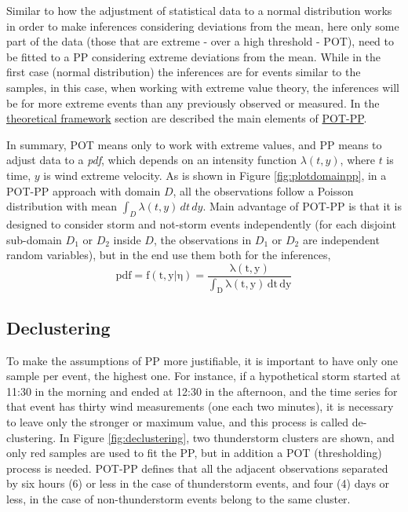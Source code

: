 \documentclass[12pt,oneside]{reedthesis}
\begin{document}
Similar to how the adjustment of statistical data to a normal distribution works in order to make inferences considering deviations from the mean, here only some part of the data (those that are extreme - over a high threshold - POT), need to be fitted to a PP considering extreme deviations from the mean. While in the first case (normal distribution) the inferences are for events similar to the samples, in this case, when working with extreme value theory, the inferences will be for more extreme events than any previously observed or measured. In the \protect\hyperlink{rmd-thefra}{theoretical framework} section are described the main elements of \protect\hyperlink{pot-pp}{POT-PP}.

In summary, POT means only to work with extreme values, and PP means to adjust data to a \emph{pdf}, which depends on an intensity function \(\lambda(t,y)\), where \(t\) is time, \(y\) is wind extreme velocity. As is shown in Figure \ref{fig:plotdomainpp}, in a POT-PP approach with domain \(D\), all the observations follow a Poisson distribution with mean \(\int_D\lambda(t,y)\,dt\,dy\). Main advantage of POT-PP is that it is designed to consider storm and not-storm events independently (for each disjoint sub-domain \(D_1\) or \(D_2\) inside \(D\), the observations in \(D_1\) or \(D_2\) are independent random variables), but in the end use them both for the inferences,
\begin{equation}
  \mathrm{
          pdf = f(t,y|\eta) = \frac{\lambda(t,y)}{\int_D\lambda(t,y)\,dt\,dy}
        }
  \label{eq:pppdf}
\end{equation}
\hypertarget{decluster}{%
\subsection{Declustering}\label{decluster}}

To make the assumptions of PP more justifiable, it is important to have only one sample per event, the highest one. For instance, if a hypothetical storm started at 11:30 in the morning and ended at 12:30 in the afternoon, and the time series for that event has thirty wind measurements (one each two minutes), it is necessary to leave only the stronger or maximum value, and this process is called de-clustering. In Figure \ref{fig:declustering}, two thunderstorm clusters are shown, and only red samples are used to fit the PP, but in addition a POT (thresholding) process is needed. POT-PP defines that all the adjacent observations separated by six hours (6) or less in the case of thunderstorm events, and four (4) days or less, in the case of non-thunderstorm events belong to the same cluster.
\end{document}
